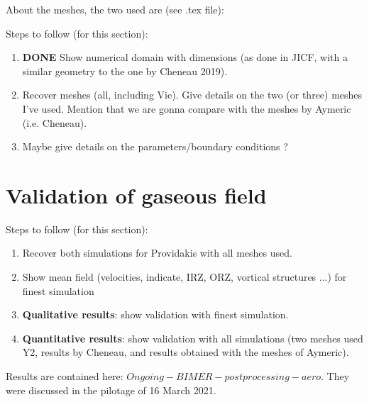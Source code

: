 About the meshes, the two used are (see .tex file): %

Steps to follow (for this section):

\begin{enumerate}
	
	\item \textbf{DONE} Show numerical domain with dimensions (as done in JICF, with a similar geometry to the one by Cheneau 2019).
	
	\item Recover meshes (all, including Vie). Give details on the two (or three) meshes I've used. Mention that we are gonna compare with the meshes by Aymeric (i.e. Cheneau).
	
	\item Maybe give details on the parameters/boundary conditions ?

\end{enumerate}



\section{Validation of gaseous field}

Steps to follow (for this section):

\begin{enumerate}
	
	\item Recover both simulations for Providakis with all meshes used.
	
	\item Show mean field (velocities, indicate, IRZ, ORZ, vortical structures ...) for finest simulation
	
	\item \textbf{Qualitative results}: show validation with finest simulation.
	
	\item \textbf{Quantitative results}: show validation with all simulations (two meshes used Y2, results by Cheneau, and results obtained with the meshes of Aymeric).
	

\end{enumerate}

Results are contained here: $Ongoing - BIMER - postprocessing - aero$. They were discussed in the pilotage of 16 March 2021.



